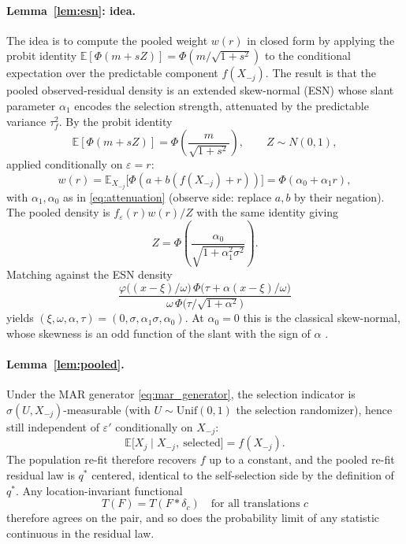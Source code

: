 \documentclass[conference]{IEEEtran}
\begin{document}
\paragraph{Lemma~\ref{lem:esn}: idea.}
The idea is to compute the pooled weight $w(r)$ in closed form by applying the probit
identity $\mathbb{E}[\Phi(m+sZ)]=\Phi(m/\sqrt{1+s^2})$ to the conditional expectation over
the predictable component $f(X_{-j})$. The result is that the pooled observed-residual
density is an extended skew-normal (ESN) whose slant parameter $\alpha_1$ encodes the
selection strength, attenuated by the predictable variance $\tau_f^2$.
By the probit identity
\begin{equation}
\mathbb{E}[\Phi(m+sZ)]=\Phi\!\left(\frac{m}{\sqrt{1+s^2}}\right),\qquad Z\sim N(0,1),
\label{eq:probit_identity}
\end{equation}
applied conditionally on $\varepsilon=r$:
\begin{equation}
w(r)=\mathbb{E}_{X_{-j}}\bigl[\Phi(a+b(f(X_{-j})+r))\bigr]
=\Phi(\alpha_0+\alpha_1 r),
\label{eq:pooled_weight}
\end{equation}
with $\alpha_1,\alpha_0$ as in \eqref{eq:attenuation} (observe side:
replace $a,b$ by their negation). The pooled density is $f_\varepsilon(r)w(r)/Z$ with the same
identity giving
\begin{equation}
Z=\Phi\!\left(\frac{\alpha_0}{\sqrt{1+\alpha_1^2\sigma^2}}\right).
\label{eq:proof_norm_const}
\end{equation}
Matching against the ESN density
\begin{equation}
\frac{\varphi\bigl((x-\xi)/\omega\bigr)\,\Phi\bigl(\tau+\alpha(x-\xi)/\omega\bigr)}
{\omega\,\Phi\bigl(\tau/\sqrt{1+\alpha^2}\bigr)}
\label{eq:proof_esn_density}
\end{equation}
yields $(\xi,\omega,\alpha,\tau)=(0,\sigma,\alpha_1\sigma,\alpha_0)$. At $\alpha_0=0$ this is
the classical skew-normal, whose skewness is an odd function of the slant with the sign of
$\alpha$ \cite{azzalini2013}.

\paragraph{Lemma~\ref{lem:pooled}.}
Under the MAR generator \eqref{eq:mar_generator}, the selection indicator is
$\sigma(U,X_{-j})$-measurable (with $U\sim\mathrm{Unif}(0,1)$ the selection randomizer),
hence still independent of $\varepsilon'$ conditionally on $X_{-j}$:
\begin{equation}
\mathbb{E}\bigl[X_j \mid X_{-j},\ \text{selected}\bigr] = f(X_{-j}).
\label{eq:proof_cond_mean}
\end{equation}
The population re-fit therefore recovers $f$ up to a constant, and the pooled re-fit
residual law is $q^\ast$ centered, identical to the self-selection side by the
definition of $q^\ast$. Any location-invariant functional
\begin{equation}
T(F) = T(F * \delta_c)\quad \text{for all translations } c
\label{eq:proof_loc_inv}
\end{equation}
therefore agrees on the pair, and so does the probability limit of any statistic
continuous in the residual law.
\end{document}
